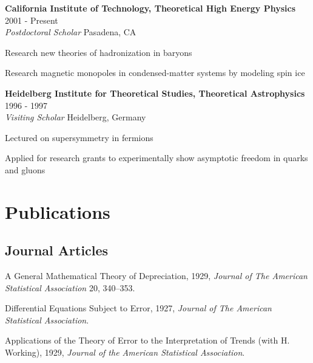 \documentclass[letterpaper]{article}
\renewenvironment{itemize}{
  \begin{list}{}{
    \setlength{\leftmargin}{1.5em}
  }
}{
  \end{list}
}
\begin{document}
\begin{itemize}
  \setlength\itemsep{0em}

  \item[$\bullet$] \textbf{ California Institute of Technology, Theoretical High Energy Physics } \hfill 2001 - Present \\
  {\em Postdoctoral Scholar} \hfill Pasadena, CA
  \begin{itemize}
      \item[$\cdot$] Research new theories of hadronization in baryons
      \item[$\cdot$] Research magnetic monopoles in condensed-matter systems by modeling spin ice
  \end{itemize}

  \item[$\bullet$] \textbf{ Heidelberg Institute for Theoretical Studies, Theoretical Astrophysics } \hfill 1996 - 1997 \\
  {\em Visiting Scholar} \hfill Heidelberg, Germany
  \begin{itemize}
      \item[$\cdot$] Lectured on supersymmetry in fermions
      \item[$\cdot$] Applied for research grants to experimentally show asymptotic freedom in quarks and gluons
  \end{itemize}

\end{itemize}

\section*{Publications}

\subsection*{Journal Articles}

\begin{itemize}
\item A General Mathematical Theory of Depreciation, 1929, {\it Journal
    of The American Statistical Association} 20, 340--353.
\item Differential Equations Subject to Error, 1927, {\it Journal of The
    American Statistical Association}.
\item Applications of the Theory of Error to the Interpretation of
  Trends (with H. Working), 1929, {\it Journal of the American
    Statistical Association}.
\end{itemize}
\end{document}
